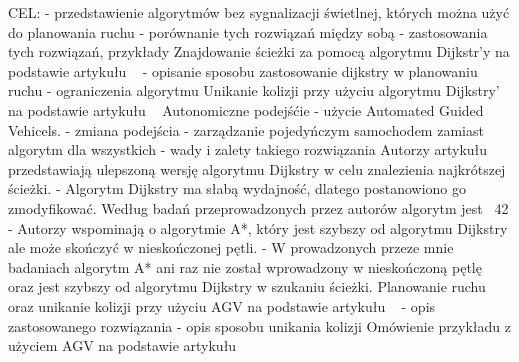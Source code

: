 CEL:
\newline
- przedstawienie algorytmów bez sygnalizacji świetlnej, których można użyć do planowania ruchu
\newline
- porównanie tych rozwiązań między sobą
\newline
- zastosowania tych rozwiązań, przykłady
\newline
\newline
Znajdowanie ścieżki za pomocą algorytmu Dijkstr'y na podstawie artykułu ~\cite{shaikh2013agv} 
\newline
- opisanie sposobu zastosowanie dijkstry w planowaniu ruchu
\newline
- ograniczenia algorytmu
\newline
\newline
Unikanie kolizji przy użyciu algorytmu Dijkstry' na podstawie artykułu ~\cite{shaikh2013agv} 
\newline
\newline
Autonomiczne podejśćie - użycie Automated Guided Vehicels.
\newline
- zmiana podejścia - zarządzanie pojedyńczym samochodem zamiast algorytm dla wszystkich
\newline
- wady i zalety takiego rozwiązania
\newline
\newline
Autorzy artykułu ~\cite{huang2013improved} przedstawiają ulepszoną wersję algorytmu Dijkstry w celu znalezienia najkrótszej ścieżki.
\newline
- Algorytm Dijkstry ma słabą wydajność, dlatego postanowiono go zmodyfikować. Według badań przeprowadzonych przez autorów algorytm jest ~42%
\newline
- Autorzy wspominają o algorytmie A*, który jest szybszy od algorytmu Dijkstry ale może skończyć w nieskończonej pętli.
\newline
- W prowadzonych przeze mnie badaniach algorytm A* ani raz nie został wprowadzony w nieskończoną pętlę oraz jest szybszy od algorytmu Dijkstry w szukaniu ścieżki.
\newline
\newline
Planowanie ruchu oraz unikanie kolizji przy użyciu AGV na podstawie artykułu ~\cite{szczerba2000robust}
\newline
- opis zastosowanego rozwiązania
\newline
- opis sposobu unikania kolizji
\newline
\newline
Omówienie przykładu z użyciem AGV na podstawie artykułu ~\cite{szczerba2000robust}
